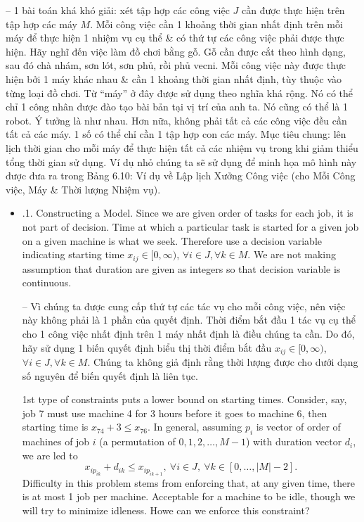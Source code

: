 \documentclass{article}
\begin{document}
\begin{itemize}
\begin{itemize}
        -- 1 bài toán khá khó giải: xét tập hợp các công việc $J$ cần được thực hiện trên tập hợp các máy $M$. Mỗi công việc cần 1 khoảng thời gian nhất định trên mỗi máy để thực hiện 1 nhiệm vụ cụ thể \& có thứ tự các công việc phải được thực hiện. Hãy nghĩ đến việc làm đồ chơi bằng gỗ. Gỗ cần được cắt theo hình dạng, sau đó chà nhám, sơn lót, sơn phủ, rồi phủ vecni. Mỗi công việc này được thực hiện bởi 1 máy khác nhau \& cần 1 khoảng thời gian nhất định, tùy thuộc vào từng loại đồ chơi. Từ ``máy'' ở đây được sử dụng theo nghĩa khá rộng. Nó có thể chỉ 1 công nhân được đào tạo bài bản tại vị trí của anh ta. Nó cũng có thể là 1 robot. Ý tưởng là như nhau. Hơn nữa, không phải tất cả các công việc đều cần tất cả các máy. 1 số có thể chỉ cần 1 tập hợp con các máy. Mục tiêu chung: lên lịch thời gian cho mỗi máy để thực hiện tất cả các nhiệm vụ trong khi giảm thiểu tổng thời gian sử dụng. Ví dụ nhỏ chúng ta sẽ sử dụng để minh họa mô hình này được đưa ra trong {\sf Bảng 6.10: Ví dụ về Lập lịch Xưởng Công việc (cho Mỗi Công việc, Máy \& Thời lượng Nhiệm vụ).}
        \begin{itemize}
            \item {.1. Constructing a Model.} Since we are given order of tasks for each job, it is not part of decision. Time at which a particular task is started for a given job on a given machine is what we seek. Therefore use a decision variable indicating starting time $x_{ij}\in[0,\infty)$, $\forall i\in J,\forall k\in M$. We are not making assumption that duration are given as integers so that decision variable is continuous.

            -- Vì chúng ta được cung cấp thứ tự các tác vụ cho mỗi công việc, nên việc này không phải là 1 phần của quyết định. Thời điểm bắt đầu 1 tác vụ cụ thể cho 1 công việc nhất định trên 1 máy nhất định là điều chúng ta cần. Do đó, hãy sử dụng 1 biến quyết định biểu thị thời điểm bắt đầu $x_{ij}\in[0,\infty)$, $\forall i\in J,\forall k\in M$. Chúng ta không giả định rằng thời lượng được cho dưới dạng số nguyên để biến quyết định là liên tục.

            1st type of constraints puts a lower bound on starting times. Consider, say, job 7 must use machine 4 for 3 hours before it goes to machine 6, then starting time is $x_{74} + 3\le x_{76}$. In general, assuming $p_i$ is vector of order of machines of job $i$ (a permutation of $0,1,2,\ldots,M - 1$) with duration vector $d_i$, we are led to
            \begin{equation*}
                x_{ip_{ik}} + d_{ik}\le x_{ip_{ik + 1}},\ \forall i\in J,\ \forall k\in[0,\ldots,|M| - 2].
            \end{equation*}
            Difficulty in this problem stems from enforcing that, at any given time, there is at most 1 job per machine. Acceptable for a machine to be idle, though we will try to minimize idleness. Howe can we enforce this constraint?


\end{itemize}
\end{itemize}
\end{itemize}
\end{document}

